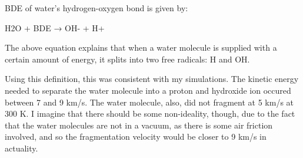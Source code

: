 \documentclass[12pt]{article}
\begin{document}
BDE of water’s hydrogen-oxygen bond is given by:

H2O + BDE → OH- + H+

The above equation explains that when a water molecule is supplied with a certain amount of energy, it splits into two free radicals: H and OH.\cite{Turito_2023}

Using this definition, this was consistent with my simulations. The kinetic energy needed to separate the water molecule into a proton and hydroxide ion occured between 7 and 9 km/s. The water molecule, also, did not fragment at 5 km/s at 300 K. I imagine that there should be some non-ideality, though, due to the fact that the water molecules are not in a vacuum, as there is some air friction involved, and so the fragmentation velocity would be closer to 9 km/s in actuality.



\end{document}
